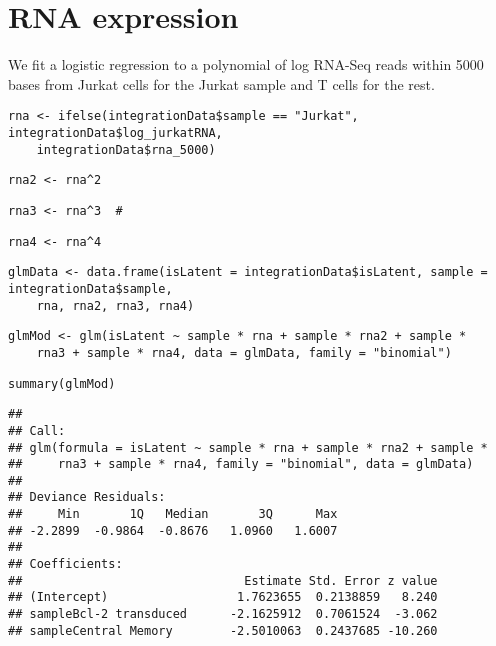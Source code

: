\documentclass[../../sherrill-Mix_thesis.tex]{subfiles}
\makeatletter
\newenvironment{kframe}{%
 \def\at@end@of@kframe{}%
 \ifinner\ifhmode%
  \def\at@end@of@kframe{\end{minipage}}%
  \begin{minipage}{\columnwidth}%
 \fi\fi%
 \def\FrameCommand##1{\hskip\@totalleftmargin \hskip-\fboxsep
 \colorbox{shadecolor}{##1}\hskip-\fboxsep
     \hskip-\linewidth \hskip-\@totalleftmargin \hskip\columnwidth}%
 \MakeFramed {\advance\hsize-\width
   \@totalleftmargin\z@ \linewidth\hsize
   \@setminipage}}%
 {\par\unskip\endMakeFramed%
 \at@end@of@kframe}
\newenvironment{knitrout}{}{} %
\makeatother
\begin{document}
\section{RNA expression}
We fit a logistic regression to a polynomial of log RNA-Seq reads within 5000 bases from Jurkat cells for the Jurkat sample and T cells for the rest.
\begin{knitrout}
\color{fgcolor}\begin{kframe}
\begin{lstlisting}[basicstyle=\ttfamily,breaklines=true]
rna <- ifelse(integrationData$sample == "Jurkat", integrationData$log_jurkatRNA, 
    integrationData$rna_5000)\end{lstlisting}
\begin{lstlisting}[basicstyle=\ttfamily,breaklines=true]
rna2 <- rna^2\end{lstlisting}
\begin{lstlisting}[basicstyle=\ttfamily,breaklines=true]
rna3 <- rna^3  # \end{lstlisting}
\begin{lstlisting}[basicstyle=\ttfamily,breaklines=true]
rna4 <- rna^4\end{lstlisting}
\begin{lstlisting}[basicstyle=\ttfamily,breaklines=true]
glmData <- data.frame(isLatent = integrationData$isLatent, sample = integrationData$sample, 
    rna, rna2, rna3, rna4)\end{lstlisting}
\begin{lstlisting}[basicstyle=\ttfamily,breaklines=true]
glmMod <- glm(isLatent ~ sample * rna + sample * rna2 + sample * 
    rna3 + sample * rna4, data = glmData, family = "binomial")\end{lstlisting}
\begin{lstlisting}[basicstyle=\ttfamily,breaklines=true]
summary(glmMod)\end{lstlisting}
\begin{lstlisting}[basicstyle=\ttfamily,breaklines=true]
## 
## Call:
## glm(formula = isLatent ~ sample * rna + sample * rna2 + sample * 
##     rna3 + sample * rna4, family = "binomial", data = glmData)
## 
## Deviance Residuals: 
##     Min       1Q   Median       3Q      Max  
## -2.2899  -0.9864  -0.8676   1.0960   1.6007  
## 
## Coefficients:
##                               Estimate Std. Error z value
## (Intercept)                  1.7623655  0.2138859   8.240
## sampleBcl-2 transduced      -2.1625912  0.7061524  -3.062
## sampleCentral Memory        -2.5010063  0.2437685 -10.260

\end{lstlisting}
\end{kframe}
\end{knitrout}
\end{document}
